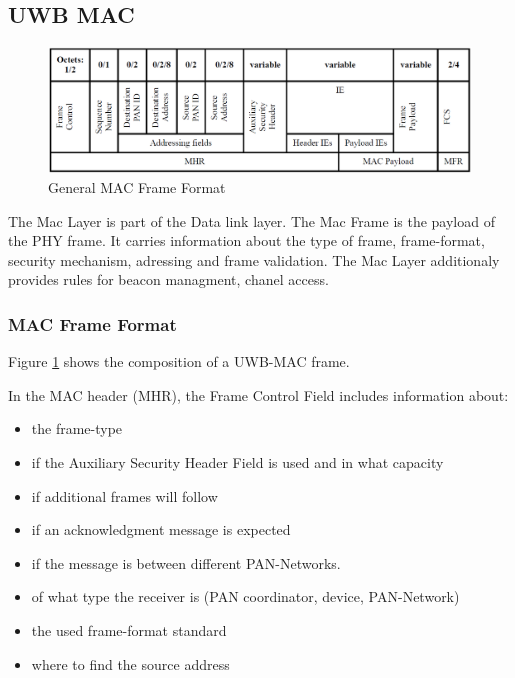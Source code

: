 \subsection{UWB MAC}
\label{sec:UWB MAC}

\begin{figure}[ht!]
\centering
\includegraphics[width=\linewidth]{graphics/general_MAC_Frame_Format.png}
\caption{General MAC Frame Format \cite{IEEE4-2020-7}}
\label{f:MAC Frame Format}
\end{figure}

The Mac Layer is part of the Data link layer.
The Mac Frame is the payload of the PHY frame. It carries information about the type of frame, frame-format, security mechanism, adressing and frame validation.
The Mac Layer additionaly provides rules for beacon managment, chanel access.


\subsubsection{MAC Frame Format}

Figure \ref{f:MAC Frame Format} shows the composition of a UWB-MAC frame.

In the MAC header (MHR), the Frame Control Field includes information about:

\begin{itemize}
  \item the frame-type
  \item if the Auxiliary Security Header Field is used and in what capacity
  \item if additional frames will follow
  \item if an acknowledgment message is expected
  \item if the message is between different PAN-Networks.
  \item of what type the receiver is (PAN coordinator, device, PAN-Network)
  \item the used frame-format standard
  \item where to find the source address
\end{itemize}

